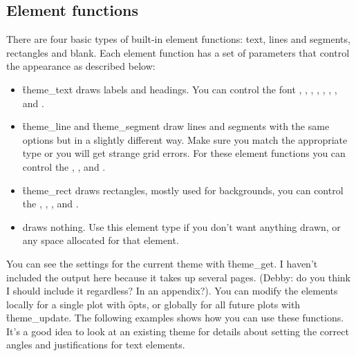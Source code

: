 \subsection{Element functions}
\label{sub:element-functions}

There are four basic types of built-in element functions: text, lines and segments, rectangles and blank.  Each element function has a set of parameters that control the appearance as described below:

\begin{itemize}
  \item \f{theme_text} draws labels and headings. You can control the font , , , , , , , and .

  \item \f{theme_line} and \f{theme_segment} draw lines and segments with the same options but in a slightly different way.  Make sure you match the appropriate type or you will get strange grid errors.  For these element functions you can control the , , and .

  \item \f{theme_rect} draws rectangles, mostly used for backgrounds, you can control the , , , and .

  \item {} draws nothing.  Use this element type if you don't want anything drawn, or any space allocated for that element.  

\end{itemize}

You can see the settings for the current theme with \f{theme_get}.  I haven't included the output here because it takes up several pages.  (Debby: do you think I should include it regardless?  In an appendix?).  You can modify the elements locally for a single plot with \f{opts}, or globally for all future plots with \f{theme_update}.  The following examples shows how you can use these functions.  It's a good idea to look at an existing theme for details about setting the correct angles and justifications for text elements.

% 


